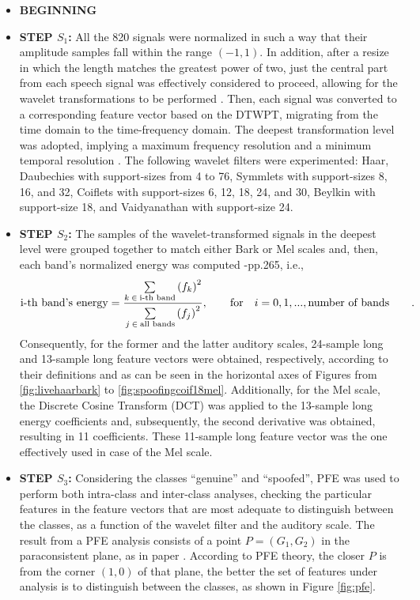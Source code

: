 \begin{itemize}
\item{}\textbf{BEGINNING}
\item{}\textbf{STEP $S_1$: }All the 820 signals were normalized in such a way that their amplitude samples fall within the range $(-1,1)$. In addition, after a resize in which the length matches the greatest power of two, just the central part from each speech signal was effectively considered to proceed, allowing for the wavelet transformations to be performed \cite{guidodwt1}. Then, each signal was converted to a corresponding feature vector based on the DTWPT, migrating from the time domain to the time-frequency domain. The deepest transformation level was adopted, implying a maximum frequency resolution and a minimum temporal resolution \cite{guidodwt1}. The following wavelet filters were experimented: Haar, Daubechies with support-sizes from 4 to 76, Symmlets with support-sizes 8, 16, and 32, Coiflets with support-sizes 6, 12, 18, 24, and 30, Beylkin with support-size 18, and Vaidyanathan with support-size 24. 
\item{}\textbf{STEP $S_2$: }The samples of the wavelet-transformed signals in the deepest level were grouped together to match either Bark \cite{bossi} or Mel scales \cite{bossi2} and, then, each band's normalized energy was computed \cite{tut_se}-pp.265, i.e., $$\text{i-th band's energy}=\frac{\sum\limits_{k \hspace*{+2pt} \in \hspace*{+2pt} \text{i-th band}}{{(f_k)}^{2}}}{\sum\limits_{j \hspace*{+2pt} \in \hspace*{+2pt} \text{all bands}}^{}{(f_j)}^{2}}, \qquad \text{for} \quad i=0, 1, ..., \text{number of bands}\qquad .$$ Consequently, for the former and the latter auditory scales, 24-sample long and 13-sample long feature vectors were obtained, respectively, according to their definitions \cite{bossi2} and as can be seen in the horizontal axes of Figures from \ref{fig:livehaarbark} to \ref{fig:spoofingcoif18mel}. Additionally, for the Mel scale, the Discrete Cosine Transform (DCT) was applied to the 13-sample long energy coefficients and, subsequently, the second derivative was obtained, resulting in 11 coefficients. These 11-sample long feature vector was the one effectively used in case of the Mel scale. 
\item{}\textbf{STEP $S_3$: }Considering the classes ``genuine'' and ``spoofed'', PFE was used to perform both intra-class and inter-class analyses, checking the particular features in the feature vectors that are most adequate to distinguish between the classes, as a function of the wavelet filter and the auditory scale. The result from a PFE analysis consists of a point $P=(G_1,G_2)$ in the paraconsistent plane, as in paper \cite{8588433}. According to PFE theory, the closer $P$ is from the corner $(1,0)$ of that plane, the better the set of features under analysis is to distinguish between the classes, as shown in Figure \ref{fig:pfe}. 

\end{itemize}

